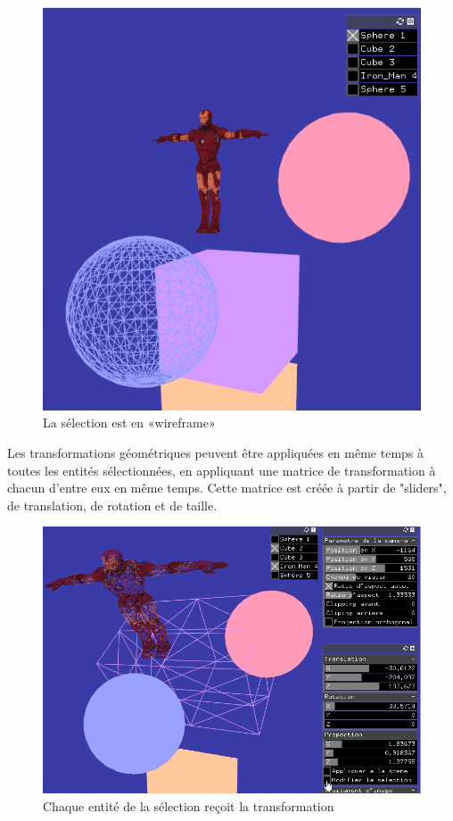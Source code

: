 \begin{figure}[h]
	\centering
	\includegraphics[width=12cm]{fig/WireframeSelection.png}
	\caption{La sélection est en «wireframe»}
	\label{fig:avantTransformation}
\end{figure}

\newpage

Les transformations géométriques peuvent être appliquées en même temps à toutes les entités sélectionnées, en appliquant une matrice de transformation à chacun d'entre eux en même temps. Cette matrice est créée à partir de "sliders", de translation, de rotation et de taille.

\begin{figure}[h]
	\centering
	\includegraphics[width=18cm]{fig/transformationSelection.png}
	\caption{Chaque entité de la sélection reçoit la transformation}
	\label{fig:apresTransformation}
\end{figure}

